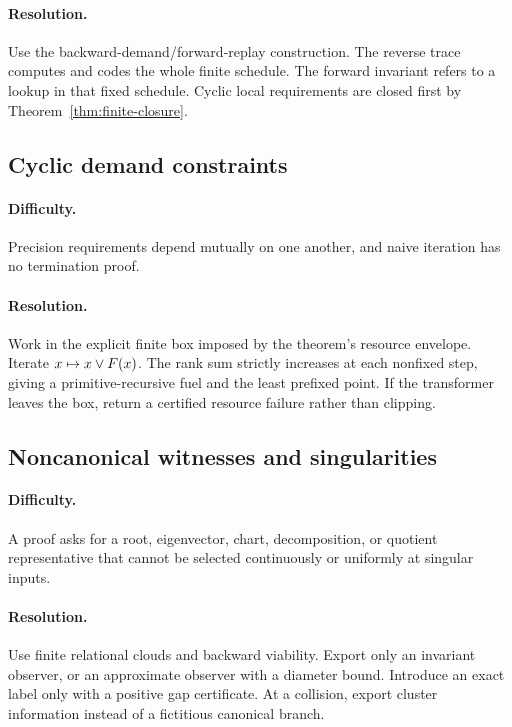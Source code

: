 \paragraph{Resolution.}
Use the backward-demand/forward-replay construction.  The reverse trace computes
and codes the whole finite schedule.  The forward invariant refers to a lookup
in that fixed schedule.  Cyclic local requirements are closed first by
Theorem~\ref{thm:finite-closure}.

\subsection{Cyclic demand constraints}

\paragraph{Difficulty.}
Precision requirements depend mutually on one another, and naive iteration has
no termination proof.

\paragraph{Resolution.}
Work in the explicit finite box imposed by the theorem's resource envelope.
Iterate \(x\mapsto x\mathbin{\vee} F(x)\).  The rank sum strictly increases at each
nonfixed step, giving a primitive-recursive fuel and the least prefixed point.
If the transformer leaves the box, return a certified resource failure rather
than clipping.

\subsection{Noncanonical witnesses and singularities}

\paragraph{Difficulty.}
A proof asks for a root, eigenvector, chart, decomposition, or quotient
representative that cannot be selected continuously or uniformly at singular
inputs.

\paragraph{Resolution.}
Use finite relational clouds and backward viability.  Export only an invariant
observer, or an approximate observer with a diameter bound.  Introduce an exact
label only with a positive gap certificate.  At a collision, export cluster
information instead of a fictitious canonical branch.

